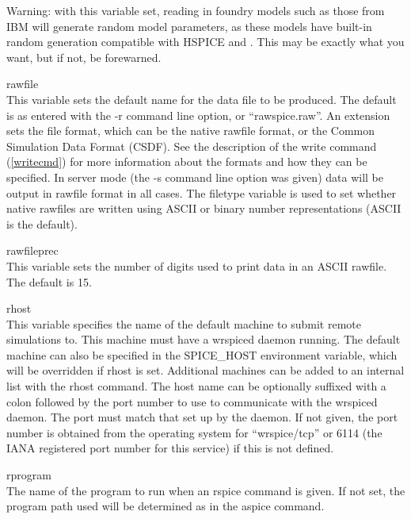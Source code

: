 \begin{description}
Warning:  with this variable set, reading in foundry models such as
those from IBM will generate random model parameters, as these models
have built-in random generation compatible with HSPICE and {\WRspice}. 
This may be exactly what you want, but if not, be forewarned.

\item{\et rawfile}\\
This variable sets the default name for the data file to be produced. 
The default is as entered with the {\vt -r} command line option, or
``{\vt rawspice.raw}''.  An extension sets the file format, which can
be the native rawfile format, or the Common Simulation Data Format
(CSDF).  See the description of the {\cb write} command
(\ref{writecmd}) for more information about the formats and how they
can be specified.  In server mode (the {\vt -s} command line option
was given) data will be output in rawfile format in all cases.  The
{\vt filetype} variable is used to set whether native rawfiles are
written using ASCII or binary number representations (ASCII is the
default).

\item{\et rawfileprec}\\
This variable sets the number of digits used to print data in an ASCII
rawfile.  The default is 15.

\item{\et rhost}\\
This variable specifies the name of the default machine to submit
remote simulations to.  This machine must have a {\vt wrspiced} daemon
running.  The default machine can also be specified in the {\et
SPICE\_HOST} environment variable, which will be overridden if {\et
rhost} is set.  Additional machines can be added to an internal list
with the {\cb rhost} command.  The host name can be optionally
suffixed with a colon followed by the port number to use to
communicate with the {\vt wrspiced} daemon.  The port must match that
set up by the daemon.  If not given, the port number is obtained from
the operating system for ``{\vt wrspice/tcp}'' or 6114 (the IANA
registered port number for this service) if this is not defined.

\item{\et rprogram}\\
The name of the program to run when an {\cb rspice} command is given. 
If not set, the program path used will be determined as in the {\cb
aspice} command.


\end{description}
